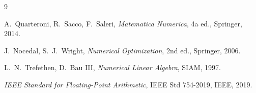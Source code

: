 \documentclass[12pt, a4paper, twoside]{book}
\theoremstyle{plain}
\theoremstyle{definition}
\begin{document}










\begin{thebibliography}{9}

A.\ Quarteroni, R.\ Sacco, F.\ Saleri,
\textit{Matematica Numerica},
4a ed., Springer, 2014.

J.\ Nocedal, S.\ J.\ Wright,
\textit{Numerical Optimization},
2nd ed., Springer, 2006.

L.\ N.\ Trefethen, D.\ Bau III,
\textit{Numerical Linear Algebra},
SIAM, 1997.

\textit{IEEE Standard for Floating-Point Arithmetic},
IEEE Std 754-2019, IEEE, 2019.

\end{thebibliography}
\end{document}
